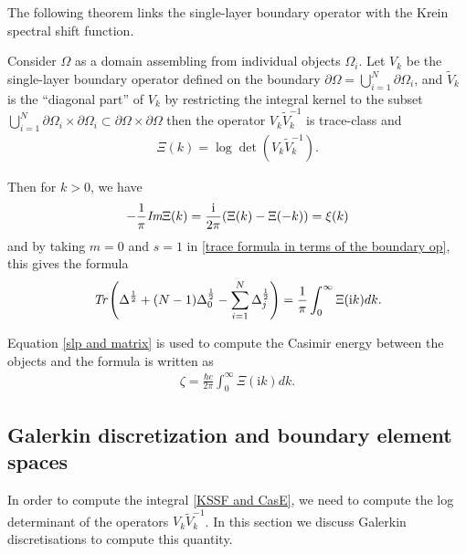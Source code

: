 The following theorem links the single-layer boundary operator with the Krein spectral shift function.
\begin{theorem}\cite{hanisch2020relative}
    Consider $\Omega$ as a domain assembling from individual objects $\Omega_{i}$. Let $V_{k}$ be the single-layer boundary operator defined on the boundary 
    $\partial\Omega = \bigcup_{i = 1}^{N}\partial\Omega_{i}$, and $\tilde{V}_{k}$ is the ``diagonal part'' of $V_{k}$ by restricting the integral 
    kernel to the subset $\bigcup_{i = 1}^{N}\partial\Omega_{i}\times\partial\Omega_{i}\subset\partial\Omega\times\partial\Omega$ then the operator 
    $V_{k}\tilde{V}_{k}^{-1}$ is trace-class and 
    \begin{align*}
        \Xi(k) = \log\det\left(V_{k}\tilde{V}_{k}^{-1}\right).
    \end{align*}

    Then for $k > 0$, we have 
    \begin{align*}
        -\frac{1}{\pi}\emph{\text{Im}}\Xi(k) = \frac{\mathrm{i}}{2\pi}(\Xi(k) - \Xi(-k)) = \xi(k)
    \end{align*}
    and by taking $m = 0$ and $s = 1$ in \eqref{trace formula in terms of the boundary op}, this gives the formula 
    \begin{align}\label{slp and matrix}
        \emph{\text{Tr}}\left(\Delta^{\frac{1}{2}} + (N - 1)\Delta_{0}^{\frac{1}{2}} - \sum_{i = 1}^{N}\Delta_{j}^{\frac{1}{2}}\right)  =  \frac{1}{\pi}\int_{0}^{\infty}\Xi(\mathrm{i}k)dk.
    \end{align}
\end{theorem}

Equation \eqref{slp and matrix} is used to compute the Casimir energy between the objects and the formula is written as
\begin{align}\label{KSSF and CasE}
    \zeta = \frac{\hbar c}{2\pi}\int_{0}^{\infty}\Xi(\mathrm{i}k)dk.
\end{align}




\subsection{Galerkin discretization and boundary element spaces}
In order to compute the integral \eqref{KSSF and CasE}, we need to compute the log determinant of the operators $V_{k}\tilde{V}_{k}^{-1}$. In this section we discuss Galerkin discretisations to compute this quantity.

